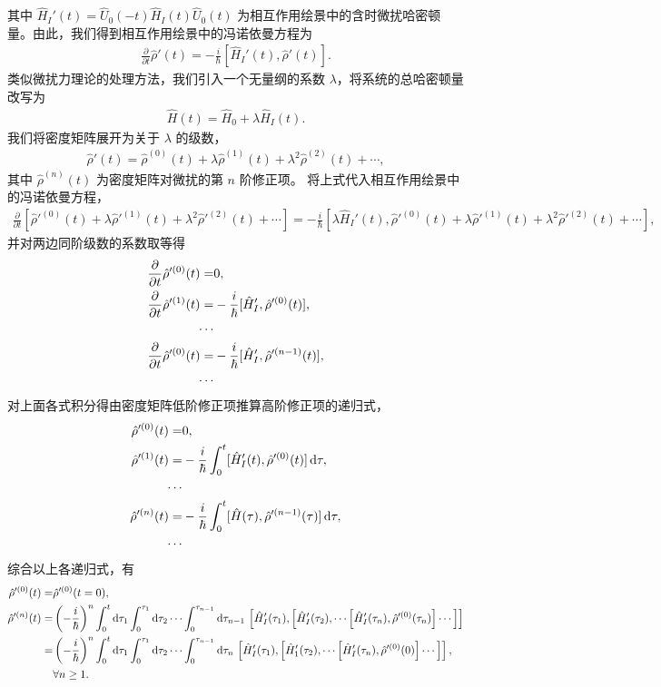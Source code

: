 \documentclass{thesis}
\begin{document}
其中 $\hat{H}_I'(t)=\hat{U}_0(-t)\hat{H}_I(t)\hat{U}_0(t)$ 为相互作用绘景中的含时微扰哈密顿量。由此，我们得到相互作用绘景中的冯诺依曼方程为
\begin{align}
    \frac{\partial}{\partial t}\hat{\rho}'(t)=-\frac{i}{\hbar}[\hat{H}_I'(t),\hat{\rho}'(t)].
\end{align}
类似微扰力理论的处理方法，我们引入一个无量纲的系数 $\lambda$，将系统的总哈密顿量改写为
\begin{align}
    \hat{H}(t)=\hat{H}_0+\lambda\hat{H}_I(t).
\end{align}
我们将密度矩阵展开为关于 $\lambda$ 的级数，
\begin{align}
    \hat{\rho}'(t)=\hat{\rho}^{(0)}(t)+\lambda\hat{\rho}^{(1)}(t)+\lambda^2\hat{\rho}^{(2)}(t)+\cdots,
\end{align}
其中 $\hat{\rho}^{(n)}(t)$ 为密度矩阵对微扰的第 $n$ 阶修正项。
将上式代入相互作用绘景中的冯诺依曼方程，
\begin{align}
    \frac{\partial}{\partial t}[\hat{\rho}'^{(0)}(t)+\lambda\hat{\rho}'^{(1)}(t)+\lambda^2\hat{\rho}'^{(2)}(t)+\cdots]=-\frac{i}{\hbar}[\lambda\hat{H}_I'(t),\hat{\rho}'^{(0)}(t)+\lambda\hat{\rho}'^{(1)}(t)+\lambda^2\hat{\rho}'^{(2)}(t)+\cdots],
\end{align}
并对两边同阶级数的系数取等得
\begin{align}
    \frac{\partial}{\partial t}\hat{\rho}'^{(0)}(t)=&0,\\
    \frac{\partial}{\partial t}\hat{\rho}'^{(1)}(t)=&-\frac{i}{\hbar}[\hat{H}_I',\hat{\rho}'^{(0)}(t)],\\
    \notag\cdots&\\
    \frac{\partial}{\partial t}\hat{\rho}'^{(0)}(t)=&-\frac{i}{\hbar}[\hat{H}_I',\hat{\rho}'^{(n-1)}(t)],\\
    \notag\cdots&
\end{align}
对上面各式积分得由密度矩阵低阶修正项推算高阶修正项的递归式，
\begin{align}
    \hat{\rho}'^{(0)}(t)=&0,\\
    \hat{\rho}'^{(1)}(t)=&-\frac{i}{\hbar}\int_0^t[\hat{H}_I'(t),\hat{\rho}'^{(0)}(t)]\,\mathrm{d}\tau,\\
    \notag\cdots&\\
    \hat{\rho}'^{(n)}(t)=&-\frac{i}{\hbar}\int_0^t[\hat{H}(\tau),\hat{\rho}'^{(n-1)}(\tau)]\,\mathrm{d}\tau,\\
    \notag\cdots&
\end{align}
综合以上各递归式，有
\begin{align}
    \hat{\rho}'^{(0)}(t)=&\hat{\rho}'^{(0)}(t=0),\\
    \notag\hat{\rho}'^{(n)}(t)=&\left(-\frac{i}{\hbar}\right)^n\int_0^t\mathrm{d}\tau_1\int_0^{\tau_1}\mathrm{d}\tau_2\cdots\int_0^{\tau_{n-1}}\mathrm{d}\tau_{n-1}\,\left[\hat{H}_I'(\tau_1),\left[\hat{H}_I'(\tau_2),\cdots\left[\hat{H}_I'(\tau_n),\hat{\rho}'^{(0)}(\tau_n)\right]\cdots\right]\right]\\
    \notag=&\left(-\frac{i}{\hbar}\right)^n\int_0^t\mathrm{d}\tau_1\int_0^{\tau_1}\mathrm{d}\tau_2\cdots\int_0^{\tau_{n-1}}\mathrm{d}\tau_n\,\left[\hat{H}_I'(\tau_1),\left[\hat{H}_1'(\tau_2),\cdots\left[\hat{H}_I'(\tau_n),\hat{\rho}'^{(0)}(0)\right]\cdots\right]\right],\\
    &\forall n\geq 1.
\end{align}
\end{document}
